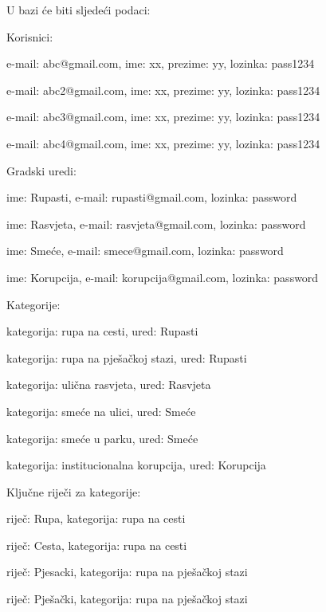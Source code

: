 			U bazi će biti sljedeći podaci:
			\begin{packed_item}
				\item Korisnici:
				\begin{packed_item}
					\item e-mail: abc@gmail.com, ime: xx, prezime: yy, lozinka: pass1234
					\item e-mail: abc2@gmail.com, ime: xx, prezime: yy, lozinka: pass1234
					\item e-mail: abc3@gmail.com, ime: xx, prezime: yy, lozinka: pass1234
					\item e-mail: abc4@gmail.com, ime: xx, prezime: yy, lozinka: pass1234
				\end{packed_item}
				\item Gradski uredi:
				\begin{packed_item}
					\item ime: Rupasti, e-mail: rupasti@gmail.com, lozinka: password
					\item ime: Rasvjeta, e-mail: rasvjeta@gmail.com, lozinka: password
					\item ime: Smeće, e-mail: smece@gmail.com, lozinka: password
					\item ime: Korupcija, e-mail: korupcija@gmail.com, lozinka: password
				\end{packed_item}
				\item Kategorije:
				\begin{packed_item}
					\item kategorija: rupa na cesti, ured: Rupasti
					\item kategorija: rupa na pješačkoj stazi, ured: Rupasti
					\item kategorija: ulična rasvjeta, ured: Rasvjeta
					\item kategorija: smeće na ulici, ured: Smeće
					\item kategorija: smeće u parku, ured: Smeće
					\item kategorija: institucionalna korupcija, ured: Korupcija
				\end{packed_item}
				\item Ključne riječi za kategorije:
				\begin{packed_item}
					\item riječ: Rupa, kategorija: rupa na cesti
					\item riječ: Cesta, kategorija: rupa na cesti
					\item riječ: Pjesacki, kategorija: rupa na pješačkoj stazi
					\item riječ: Pješački, kategorija: rupa na pješačkoj stazi

\end{packed_item}
\end{packed_item}
